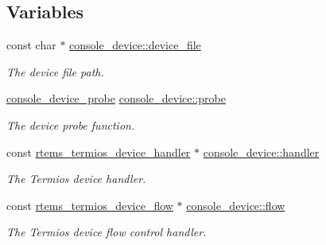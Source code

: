 \subsection*{Variables}
\begin{DoxyCompactItemize}
\item 
const char $\ast$ \mbox{\hyperlink{group__ConsoleTermios_ga0e92b47597259fb578d5a651d91255ea}{console\+\_\+device\+::device\+\_\+file}}
\begin{DoxyCompactList}\small\item\em The device file path. \end{DoxyCompactList}\item 
\mbox{\label{group__ConsoleTermios_ga986b63ec495d64d2c797805eff3cb28b}} 
\mbox{\hyperlink{group__ConsoleTermios_ga256c0a60dec13fd909e708ca271de6f1}{console\+\_\+device\+\_\+probe}} \mbox{\hyperlink{group__ConsoleTermios_ga986b63ec495d64d2c797805eff3cb28b}{console\+\_\+device\+::probe}}
\begin{DoxyCompactList}\small\item\em The device probe function. \end{DoxyCompactList}\item 
\mbox{\label{group__ConsoleTermios_ga2883081a14f477f2a3be297f737269aa}} 
const \mbox{\hyperlink{structrtems__termios__device__handler}{rtems\+\_\+termios\+\_\+device\+\_\+handler}} $\ast$ \mbox{\hyperlink{group__ConsoleTermios_ga2883081a14f477f2a3be297f737269aa}{console\+\_\+device\+::handler}}
\begin{DoxyCompactList}\small\item\em The Termios device handler. \end{DoxyCompactList}\item 
\mbox{\label{group__ConsoleTermios_gaaefe0e8802b5775c4e211a74ccf372ac}} 
const \mbox{\hyperlink{structrtems__termios__device__flow}{rtems\+\_\+termios\+\_\+device\+\_\+flow}} $\ast$ \mbox{\hyperlink{group__ConsoleTermios_gaaefe0e8802b5775c4e211a74ccf372ac}{console\+\_\+device\+::flow}}
\begin{DoxyCompactList}\small\item\em The Termios device flow control handler. \end{DoxyCompactList}\item 
\mbox{\label{group__ConsoleTermios_ga3dfebeb03f639f0c27e52128404b7141}} 

\end{DoxyCompactItemize}

